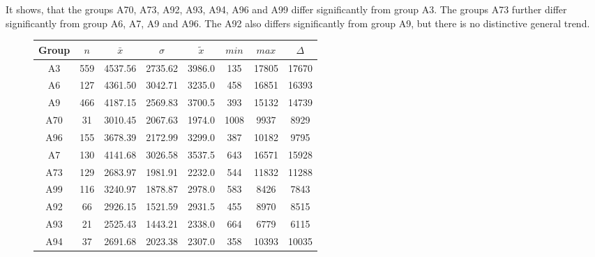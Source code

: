It shows, that the groups A70, A73, A92, A93, A94, A96 and A99 differ significantly from group A3. The groups A73 further differ significantly from group A6, A7, A9 and A96. The A92 also differs significantly from group A9, but there is no distinctive general trend.
\begin{figure}[ht!]
	\centering
	\begin{minipage}{0.5\textwidth}
		\tiny
		\setlength{\tabcolsep}{4pt}
		\centering
		\begin{tabular}{c|c|c|c|c|c|c|c}
			\toprule
			Group & $n$ & $\bar{x}$ & $\sigma$ & $\tilde{x}$ & $min$ & $max$ & $\Delta$ \\
			\midrule
			A3  & 559 & 4537.56 & 2735.62 & 3986.0 & 135  & 17805 & 17670 \\ 
			A6  & 127 & 4361.50 & 3042.71 & 3235.0 & 458  & 16851 & 16393 \\ 
			A9  & 466 & 4187.15 & 2569.83 & 3700.5 & 393  & 15132 & 14739 \\ 
			A70 & 31  & 3010.45 & 2067.63 & 1974.0 & 1008 & 9937  & 8929 \\ 
			A96 & 155 & 3678.39 & 2172.99 & 3299.0 & 387  & 10182 & 9795 \\ 
			A7  & 130 & 4141.68 & 3026.58 & 3537.5 & 643  & 16571 & 15928 \\ 
			A73 & 129 & 2683.97 & 1981.91 & 2232.0 & 544  & 11832 & 11288 \\ 
			A99 & 116 & 3240.97 & 1878.87 & 2978.0 & 583  & 8426  & 7843 \\ 
			A92 & 66  & 2926.15 & 1521.59 & 2931.5 & 455  & 8970  & 8515 \\ 
			A93 & 21  & 2525.43 & 1443.21 & 2338.0 & 664  & 6779  & 6115 \\ 
			A94 & 37  & 2691.68 & 2023.38 & 2307.0 & 358  & 10393 & 10035 \\ 
			\bottomrule
		\end{tabular}
		\label{tbl:descriptives_baysis_matched_Str_SAvg}
	\end{minipage}%
	\begin{minipage}{0.55\textwidth}
\end{minipage}
\end{figure}
